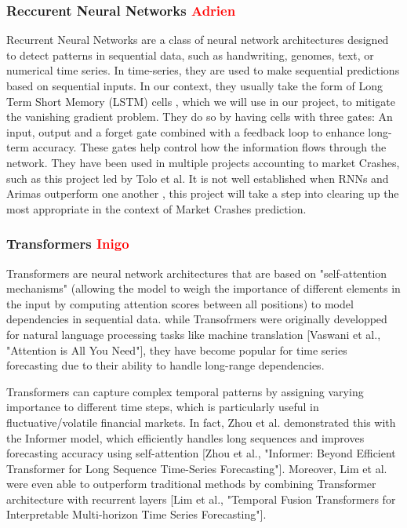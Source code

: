 \documentclass[12pt, letterpaper]{article}
\begin{document}
    \subsubsection*{Reccurent Neural Networks \textcolor{red}{Adrien}}
    Recurrent Neural Networks are a class of neural network architectures designed to detect patterns in sequential data, such as handwriting, genomes, text, or numerical time series. In time-series, they are used to make sequential predictions based on sequential inputs. \cite{Schmidt} In our context, they usually take the form of Long Term Short Memory (LSTM) cells \cite{Hansika}, which we will use in our project, to mitigate the vanishing gradient problem. They do so by having cells with three gates: An input, output and a forget gate combined with a feedback loop to enhance long-term accuracy. These gates help control how the information flows through the network. \cite{Hansika} They have been used in multiple projects accounting to market Crashes, such as this project led by Tolo et al. \cite{Tolo} It is not well established when RNNs and Arimas outperform one another \cite{Hansika}, this project will take a step into clearing up the most appropriate in the context of Market Crashes prediction.

    \subsubsection*{Transformers \textcolor{red}{Inigo}}
Transformers are neural network architectures that are based on "self-attention mechanisms" (allowing the model to weigh the importance of different elements in the input by computing attention scores between all positions) to model dependencies in sequential data. while Transofrmers were originally developped for natural language processing tasks like machine translation [Vaswani et al., "Attention is All You Need"], they have become popular for time series forecasting due to their ability to handle long-range dependencies.

Transformers can capture complex temporal patterns by assigning varying importance to different time steps, which is particularly useful in fluctuative/volatile financial markets. In fact, Zhou et al. demonstrated this with the Informer model, which efficiently handles long sequences and improves forecasting accuracy using self-attention [Zhou et al., "Informer: Beyond Efficient Transformer for Long Sequence Time-Series Forecasting"]. Moreover, Lim et al. were even able to outperform traditional methods by combining Transformer architecture with recurrent layers [Lim et al., "Temporal Fusion Transformers for Interpretable Multi-horizon Time Series Forecasting"].
\end{document}
